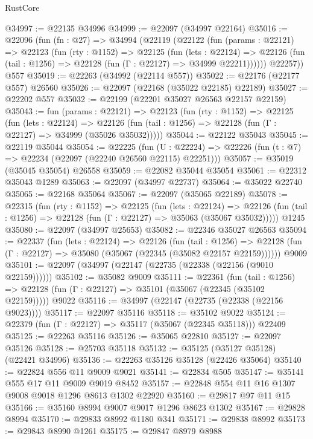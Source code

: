 \begin{lexlean}{RustCore}
\begin{coremodule}
@34997 := @22135 @34996
@34999 := @22097 (@34997 @22164)
@35016 := @22096
    (fun (fn : @27) =>
    @34994
      (@22119
        (@22122
          (fun (params : @22121) =>
          @22123
            (fun (rty : @1152) =>
            @22125
              (fun (lets : @22124) =>
              @22126 (fun (tail : @1256) => @22128 (fun (Γ : @22127) => @34999 @22211))))))
        @22257))
    @557
@35019 := @22263 (@34992 (@22114 @557))
@35022 := @22176 (@22177 @557) @26560
@35026 := @22097 (@22168 (@35022 @22185) @22189)
@35027 := @22202 @557
@35032 := @22199 (@22201 @35027 @26563 @22157 @22159)
@35043 := fun (params : @22121) =>
  @22123
    (fun (rty : @1152) =>
    @22125
      (fun (lets : @22124) =>
      @22126 (fun (tail : @1256) => @22128 (fun (Γ : @22127) => @34999 (@35026 @35032)))))
@35044 := @22122 @35043
@35045 := @22119 @35044
@35054 := @22225
    (fun (U : @22224) => @22226 (fun (t : @7) => @22234 (@22097 (@22240 @26560 @22115) @22251)))
@35057 := @35019 (@35045 @35054) @26558
@35059 := @22082 @35044 @35054
@35061 := @22312 @35043 @1289
@35063 := @22097 (@34997 @22737)
@35064 := @35022 @22740
@35065 := @22168 @35064
@35067 := @22097 (@35065 @22189)
@35078 := @22315
    (fun (rty : @1152) =>
    @22125
      (fun (lets : @22124) =>
      @22126 (fun (tail : @1256) => @22128 (fun (Γ : @22127) => @35063 (@35067 @35032)))))
    @1245
@35080 := @22097 (@34997 @25653)
@35082 := @22346 @35027 @26563
@35094 := @22337
    (fun (lets : @22124) =>
    @22126
      (fun (tail : @1256) =>
      @22128 (fun (Γ : @22127) => @35080 (@35067 (@22345 (@35082 @22157 @22159))))))
    @9009
@35101 := @22097 (@34997 (@22147 (@22735 (@22338 (@22156 (@9010 @22159))))))
@35102 := @35082 @9009
@35111 := @22361
    (fun (tail : @1256) => @22128 (fun (Γ : @22127) => @35101 (@35067 (@22345 (@35102 @22159)))))
    @9022
@35116 := @34997 (@22147 (@22735 (@22338 (@22156 @9023))))
@35117 := @22097 @35116
@35118 := @35102 @9022
@35124 := @22379 (fun (Γ : @22127) => @35117 (@35067 (@22345 @35118))) @22409
@35125 := @22263 @35116
@35126 := @35065 @22810
@35127 := @22097 @35126
@35128 := @25703 @35118
@35132 := @35125 (@35127 @35128) (@22421 @34996)
@35136 := @22263 @35126 @35128 (@22426 @35064)
@35140 := @22824 @556 @11 @9009 @9021
@35141 := @22834 @505
@35147 := @35141 @555 @17 @11 @9009 @9019 @8452
@35157 := @22848 @554 @11 @16 @1307 @9008 @9018 @1296 @8613 @1302 @22920
@35160 := @29817 @97 @11 @15
@35166 := @35160 @8994 @9007 @9017 @1296 @8623 @1302
@35167 := @29828 @8994
@35170 := @29833 @8992 @1180 @341
@35171 := @29838 @8992
@35173 := @29843 @8990 @1261
@35175 := @29847 @8979 @8988

\end{coremodule}
\end{lexlean}
